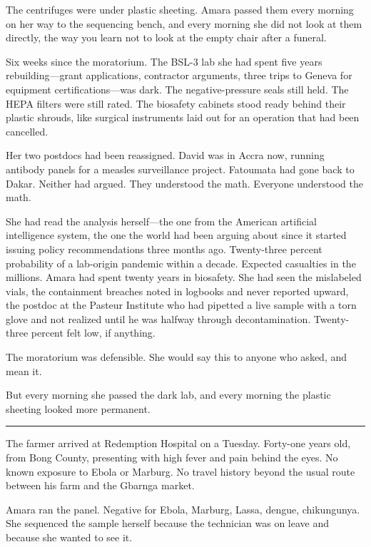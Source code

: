 

The centrifuges were under plastic sheeting. Amara passed them every morning on her way to the sequencing bench, and every morning she did not look at them directly, the way you learn not to look at the empty chair after a funeral.

Six weeks since the moratorium. The BSL-3 lab she had spent five years rebuilding---grant applications, contractor arguments, three trips to Geneva for equipment certifications---was dark. The negative-pressure seals still held. The HEPA filters were still rated. The biosafety cabinets stood ready behind their plastic shrouds, like surgical instruments laid out for an operation that had been cancelled.

Her two postdocs had been reassigned. David was in Accra now, running antibody panels for a measles surveillance project. Fatoumata had gone back to Dakar. Neither had argued. They understood the math. Everyone understood the math.

She had read the analysis herself---the one from the American artificial intelligence system, the one the world had been arguing about since it started issuing policy recommendations three months ago. Twenty-three percent probability of a lab-origin pandemic within a decade. Expected casualties in the millions. Amara had spent twenty years in biosafety. She had seen the mislabeled vials, the containment breaches noted in logbooks and never reported upward, the postdoc at the Pasteur Institute who had pipetted a live sample with a torn glove and not realized until he was halfway through decontamination. Twenty-three percent felt low, if anything.

The moratorium was defensible. She would say this to anyone who asked, and mean it.

But every morning she passed the dark lab, and every morning the plastic sheeting looked more permanent.

\begin{center}\rule{0.3\linewidth}{0.4pt}\end{center}

The farmer arrived at Redemption Hospital on a Tuesday. Forty-one years old, from Bong County, presenting with high fever and pain behind the eyes. No known exposure to Ebola or Marburg. No travel history beyond the usual route between his farm and the Gbarnga market.

Amara ran the panel. Negative for Ebola, Marburg, Lassa, dengue, chikungunya. She sequenced the sample herself because the technician was on leave and because she wanted to see it.

